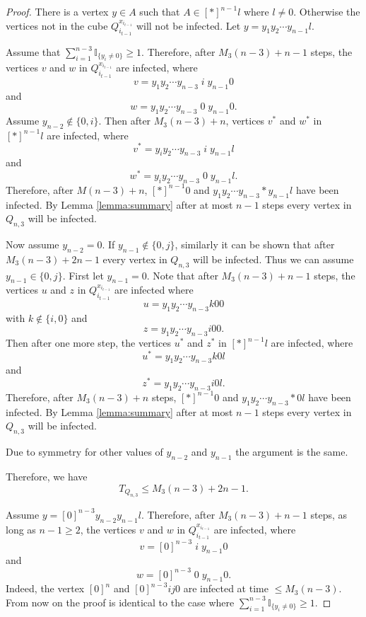 \documentclass[reqno,11pt]{amsart}
\renewcommand{\leq}{\leqslant}
\renewcommand{\geq}{\geqslant}
\begin{document}
\begin{proof}
There is a vertex $y \in A$ such that $A \in [\ast]^{n-1}l$ where $l \neq 0$. Otherwise the vertices not in the cube $Q_{i_{t-1}}^{x_{i_{t-1}}}$ will not be infected. Let $y=y_1y_2 \cdots y_{n-1}l$. 

Assume that $\sum_{i=1}^{n-3}\mathbb{I}_{\{y_i \neq 0\}} \geq 1$. Therefore, after $M_3(n-3)+n-1$ steps, the vertices $v$ and $w$ in $Q_{i_{t-1}}^{x_{i_{t-1}}}$ are infected, where 
$$v=y_1y_2\cdots y_{n-3}\;i\;y_{n-1}0$$
and 
$$w=y_1y_2\cdots y_{n-3}\;0\; y_{n-1}0.$$
Assume $y_{n-2} \notin \{0,i\}$. Then after $M_3(n-3)+n$, vertices $v^*$ and $w^*$ in $[\ast]^{n-1}l$ are infected, where 
$$v^*=y_iy_2 \cdots y_{n-3}\;i\;y_{n-1}l$$
and 
$$w^*=y_iy_2 \cdots y_{n-3}\;0\;y_{n-1}l. $$
Therefore, after $M(n-3)+n$, $[\ast]^{n-1}0$ and $y_1y_2\cdots y_{n-3}\ast y_{n-1}l$ have been infected. By Lemma \ref{lemma:summary} after at most $n-1$ steps every vertex in $Q_{n,3}$ will be infected. 

Now assume $y_{n-2}=0$. If $y_{n-1} \notin \{0,j\}$, similarly it can be shown that after $M_3(n-3)+2n-1$ every vertex in $Q_{n,3}$ will be infected. Thus we can assume $y_{n-1} \in \{0,j\}$. First let $y_{n-1}=0$. Note that after $M_3(n-3)+n-1$ steps, the vertices $u$ and $z$ in $Q_{i_{t-1}}^{x_{i_{t-1}}}$ are infected where 
$$u=y_1y_2 \cdots y_{n-3}k00$$
with $k \notin\{i,0\}$
and 
$$z=y_1y_2 \cdots y_{n-3}i00.$$
Then after one more step, the vertices $u^*$ and $z^*$ in $[\ast]^{n-1}l$ are infected, where 
$$u^*=y_1y_2 \cdots y_{n-3}k0l$$
and 
$$z^*=y_1y_2 \cdots y_{n-3}i0l.$$
Therefore, after $M_3(n-3)+n$ steps, $[\ast]^{n-1}0$ and $y_1y_2\cdots y_{n-3}\ast 0l$ have been infected. By Lemma \ref{lemma:summary} after at most $n-1$ steps every vertex in $Q_{n,3}$ will be infected. 

Due to symmetry for other values of $y_{n-2}$ and $y_{n-1}$ the argument is the same. 

Therefore, we have 
$$T_{Q_{n,3}} \leq M_3(n-3)+2n-1.$$

Assume $y=[0]^{n-3}y_{n-2}y_{n-1}l$. Therefore, after $M_3(n-3)+n-1$ steps, as long as $n-1 \geq 2$, the vertices $v$ and $w$ in $Q_{i_{t-1}}^{x_{i_{t-1}}}$ are infected, where 
$$v=[0]^{n-3}\;i\;y_{n-1}0$$
and 
$$w=[0]^{n-3}\;0\; y_{n-1}0.$$
Indeed, the vertex $[0]^n$ and $[0]^{n-3}ij0$ are infected at time $\leq M_3(n-3)$. From now on the proof is identical to the case where $\sum_{i=1}^{n-3}\mathbb{I}_{\{y_i \neq 0\}} \geq 1$. 








\end{proof}
\end{document}
